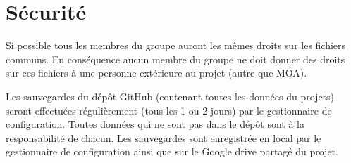 \documentclass[11pt,a4paper,titlepage,openright]{report}
\begin{document}
    \section{Sécurité}
    \par Si possible tous les membres du groupe auront les mêmes droits sur les fichiers communs.
    En conséquence aucun membre du groupe ne doit donner des droits sur ces fichiers à une
    personne extérieure au projet (autre que MOA).
    \par Les sauvegardes du dépôt GitHub (contenant toutes les données du projets) seront effectuées
    régulièrement (tous les 1 ou 2 jours) par le gestionnaire de configuration. Toutes données qui ne
    sont pas dans le dépôt sont à la responsabilité de chacun.
    Les sauvegardes sont enregistrée en local par le gestionnaire de configuration ainsi que sur le Google drive partagé du projet.



    \appendix
\end{document}
